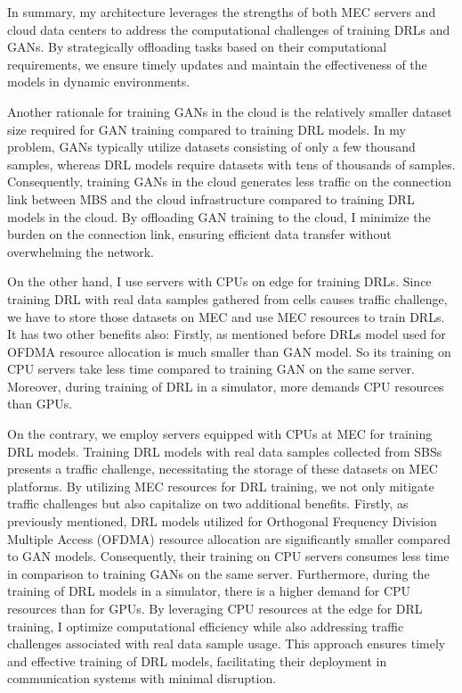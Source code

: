 \documentclass[letterpaper%
, twoside%
, 12pt%
,memoire%
, english%
,creativecommons,hyperref, withAlgo2e %
]{thETS}
\numberwithin{algorithm}{chapter}
\begin{document}
In summary, my  architecture leverages the strengths of both MEC servers and cloud data centers to address the computational challenges of training DRLs and GANs. By strategically offloading tasks based on their computational requirements, we ensure timely updates and maintain the effectiveness of the models in dynamic environments.





 
 
  
Another rationale for training GANs in the cloud is the relatively smaller dataset size required for GAN training compared to training DRL models. In my  problem, GANs typically utilize datasets consisting of only a few thousand samples, whereas DRL models require datasets with tens of thousands of samples. Consequently, training GANs in the cloud generates less traffic on the connection link between MBS and the cloud infrastructure compared to training DRL models in the cloud. By offloading GAN training to the cloud, I minimize the burden on the connection link, ensuring efficient data transfer without overwhelming the network. 
  

  On the other hand, I use servers with CPUs on edge for training DRLs. Since training DRL with real data samples gathered from cells causes traffic challenge, we have to store those datasets on MEC and use MEC resources to train DRLs. It has two other benefits also: Firstly, as mentioned before DRLs model used for OFDMA resource allocation is much smaller than GAN model. So its training on CPU servers take less time compared to training GAN on the same server. Moreover, during training of DRL in a simulator, more demands CPU resources than GPUs. 


On the contrary, we employ servers equipped with CPUs at MEC for training DRL models. Training DRL models with real data samples collected from SBSs presents a traffic challenge, necessitating the storage of these datasets on MEC platforms. By utilizing MEC resources for DRL training, we not only mitigate traffic challenges but also capitalize on two additional benefits. Firstly, as previously mentioned, DRL models utilized for Orthogonal Frequency Division Multiple Access (OFDMA) resource allocation are significantly smaller compared to GAN models. Consequently, their training on CPU servers consumes less time in comparison to training GANs on the same server. Furthermore, during the training of DRL models in a simulator, there is a higher demand for CPU resources than for GPUs. By leveraging CPU resources at the edge for DRL training, I optimize computational efficiency while also addressing traffic challenges associated with real data sample usage. This approach ensures timely and effective training of DRL models, facilitating their deployment in communication systems with minimal disruption.
\end{document}
